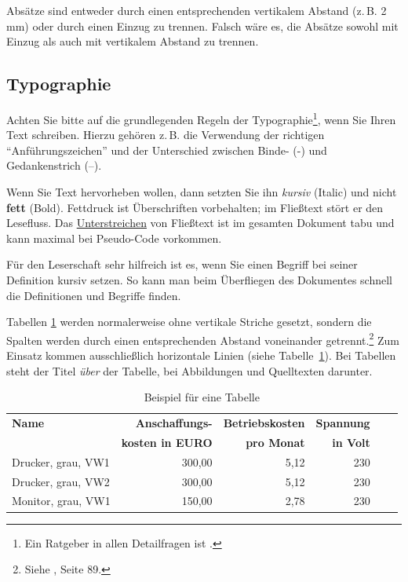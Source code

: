 \documentclass[a4paper,11pt,headings=normal]{scrartcl}
\begin{document}
Absätze sind entweder durch einen entsprechenden vertikalem Abstand (z.\,B. 2 mm) oder durch einen Einzug zu trennen. Falsch wäre es, die Absätze sowohl mit Einzug als auch mit vertikalem Abstand zu trennen.

\subsection{Typographie}
Achten Sie bitte auf die grundlegenden Regeln der Typographie\footnote{Ein Ratgeber in allen Detailfragen ist \autocite{Forssman2002}.}, wenn Sie Ihren Text schreiben. Hierzu gehören z.\,B. die Verwendung der richtigen "`Anführungszeichen"' und der Unterschied zwischen Binde- (-) und Gedankenstrich (--).

Wenn Sie Text hervorheben wollen, dann setzten Sie ihn \textit{kursiv} (Italic) und nicht \textbf{fett} (Bold). Fettdruck ist Überschriften vorbehalten; im Fließtext stört er den Lesefluss. Das \underline{Unterstreichen} von Fließtext ist im gesamten Dokument tabu und kann maximal bei Pseudo-Code vorkommen.

Für den Leserschaft sehr hilfreich ist es, wenn Sie einen Begriff bei seiner Definition kursiv setzen. So kann man beim Überfliegen des Dokumentes schnell die Definitionen und Begriffe finden.

Tabellen \ref{tabellenbeispiel} werden normalerweise ohne vertikale Striche gesetzt, sondern die Spalten werden durch einen entsprechenden Abstand voneinander getrennt.\footnote{Siehe \autocite{Willberg1999}, Seite 89.} Zum Einsatz kommen ausschließlich horizontale Linien (siehe Tabelle~\ref{tabellenbeispiel}). Bei Tabellen steht der Titel \textit{über} der Tabelle, bei Abbildungen und Quelltexten darunter.

\begin{table}
\caption{Beispiel für eine Tabelle}
\label{tabellenbeispiel}
\footnotesize
\centering
\begin{tabular}{l r r r r r}
\toprule
\textbf{Name} & \textbf{Anschaffungs-} & \textbf{Betriebskosten} & \textbf{Spannung}  \\
& \textbf{kosten in EURO} & \textbf{pro Monat} & \textbf{in Volt} \\
\midrule
Drucker, grau, VW1 &    300,00 &   5,12 & 230  \\
Drucker, grau, VW2 &    300,00 &   5,12 & 230  \\
Monitor, grau, VW1 &    150,00 &   2,78 & 230  \\
\bottomrule
\end{tabular}
\end{table}
\end{document}
